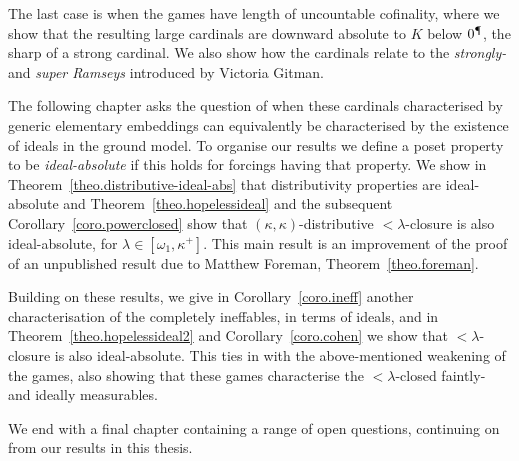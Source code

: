 \documentclass[../main]{subfiles}
\begin{document}
\begin{onehalfspacing}
\quad The last case is when the games have length of uncountable cofinality, where we show that the resulting large cardinals are downward absolute to $K$ below $0^\mathparagraph$, the sharp of a strong cardinal. We also show how the cardinals relate to the \textit{strongly-} and \textit{super Ramseys} introduced by Victoria Gitman.

\quad The following chapter asks the question of when these cardinals characterised by generic elementary embeddings can equivalently be characterised by the existence of ideals in the ground model. To organise our results we define a poset property to be \textit{ideal-absolute} if this holds for forcings having that property. We show in Theorem~\ref{theo.distributive-ideal-abs} that distributivity properties are ideal-absolute and Theorem~\ref{theo.hopelessideal} and the subsequent Corollary~\ref{coro.powerclosed} show that $(\kappa,\kappa)$-distributive ${<}\lambda$-closure is also ideal-absolute, for $\lambda\in[\omega_1,\kappa^+]$. This main result is an improvement of the proof of an unpublished result due to Matthew Foreman, Theorem~\ref{theo.foreman}. 

\quad Building on these results, we give in Corollary~\ref{coro.ineff} another characterisation of the completely ineffables, in terms of ideals, and in Theorem~\ref{theo.hopelessideal2} and Corollary~\ref{coro.cohen} we show that ${<}\lambda$-closure is also ideal-absolute. This ties in with the above-mentioned weakening of the games, also showing that these games characterise the ${<}\lambda$-closed faintly- and ideally measurables.

\quad We end with a final chapter containing a range of open questions, continuing on from our results in this thesis.

\end{onehalfspacing}
\setlength{\parindent}{0pt}
\end{document}
